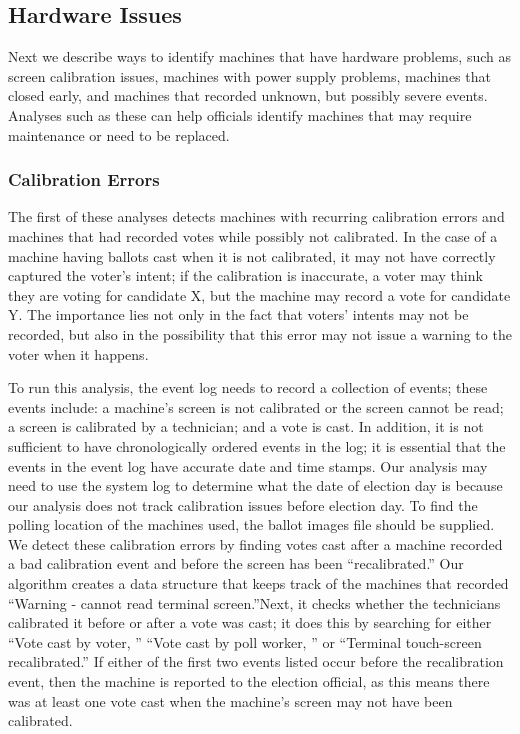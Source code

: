 \subsection{Hardware Issues}
Next we describe ways to identify machines that have hardware problems, such as screen calibration issues, machines with power supply problems, machines that closed early, and machines that recorded unknown, but possibly severe events.  Analyses such as these can help officials identify machines that may require maintenance or need to be replaced.  

\subsubsection{Calibration Errors}
The first of these analyses detects machines with recurring calibration errors and machines that had recorded votes while possibly not calibrated.  In the case of a machine having ballots cast when it is not calibrated, it may not have correctly captured the voter's intent; if the calibration is inaccurate, a voter may think they are voting for candidate X, but the machine may record a vote for candidate Y.  The importance lies not only in the fact that voters' intents may not be recorded, but also in the possibility that this error may not issue a warning to the voter when it happens.    

To run this analysis, the event log needs to record a collection of events; these events include: a machine's screen is not calibrated or the screen cannot be read; a screen is calibrated by a technician; and a vote is cast.  In addition, it is not sufficient to have chronologically ordered events in the log; it is essential that the events in the event log have accurate date and time stamps.  Our analysis may need to use the system log to determine what the date of election day is because our analysis does not track calibration issues before election day.  To find the polling location of the machines used, the ballot images file should be supplied.  We detect these calibration errors by finding votes cast after a machine recorded a bad calibration event and before the screen has been \textquotedblleft recalibrated.\textquotedblright \hspace{2 mm}  Our algorithm creates a data structure that keeps track of the machines that recorded \textquotedblleft Warning - cannot read terminal screen.\textquotedblright \hspace{2 mm}Next, it checks whether the technicians calibrated it before or after a vote was cast; it does this by searching for either \textquotedblleft Vote cast by voter, \textquotedblright \hspace{1 mm} \textquotedblleft Vote cast by poll worker, \textquotedblright \hspace{1 mm} or \textquotedblleft Terminal touch-screen recalibrated.\textquotedblright \hspace{2 mm} If either of the first two events listed occur before the recalibration event, then the machine is reported to the election official, as this means there was at least one vote cast when the machine's screen may not have been calibrated.  


